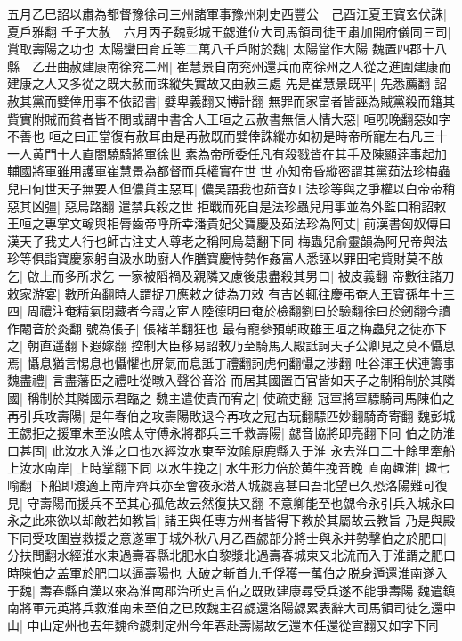 五月乙巳詔以肅為都督豫徐司三州諸軍事豫州刺史西豐公　己酉江夏王寶玄伏誅|{
	夏戶雅翻}
壬子大赦　六月丙子魏彭城王勰進位大司馬領司徒王肅加開府儀同三司|{
	賞取壽陽之功也}
太陽蠻田育丘等二萬八千戶附於魏|{
	太陽當作大陽}
魏置四郡十八縣　乙丑曲赦建康南徐兖二州|{
	崔慧景自南兖州還兵而南徐州之人從之進圍建康而建康之人又多從之既大赦而誅縱失實故又曲赦三處}
先是崔慧景既平|{
	先悉薦翻}
詔赦其黨而嬖倖用事不依詔書|{
	嬖卑義翻又博計翻}
無罪而家富者皆誣為賊黨殺而籍其貲實附賊而貧者皆不問或謂中書舍人王咺之云赦書無信人情大惡|{
	咺呪晚翻惡如字不善也}
咺之曰正當復有赦耳由是再赦既而嬖倖誅縱亦如初是時帝所寵左右凡三十一人黄門十人直閤驍騎將軍徐世素為帝所委任凡有殺戮皆在其手及陳顯逹事起加輔國將軍雖用護軍崔慧景為都督而兵權實在世世亦知帝昏縱密謂其黨茹法珍梅蟲兒曰何世天子無要人但儂貨主惡耳|{
	儂吴語我也茹音如}
法珍等與之爭權以白帝帝稍惡其凶彊|{
	惡烏路翻}
遣禁兵殺之世拒戰而死自是法珍蟲兒用事並為外監口稱詔敕王咺之專掌文翰與相脣齒帝呼所幸潘貴妃父寶慶及茹法珍為阿丈|{
	前漢書匈奴傳曰漢天子我丈人行也師古注丈人尊老之稱阿烏葛翻下同}
梅蟲兒俞靈韻為阿兄帝與法珍等俱詣寶慶家躬自汲水助廚人作膳寶慶恃勢作姦富人悉誣以罪田宅貲財莫不啟乞|{
	啟上而多所求乞}
一家被䧟禍及親隣又慮後患盡殺其男口|{
	被皮義翻}
帝數往諸刀敕家游宴|{
	數所角翻時人謂捉刀應敕之徒為刀敕}
有吉凶輒往慶弔奄人王寶孫年十三四|{
	周禮注奄精氣閉藏者今謂之宦人陸德明曰奄於檢翻劉曰於驗翻徐曰於劒翻今讀作閹音於炎翻}
號為倀子|{
	倀褚羊翻狂也}
最有寵參預朝政雖王咺之梅蟲兒之徒亦下之|{
	朝直遥翻下遐嫁翻}
控制大臣移易詔敕乃至騎馬入殿詆訶天子公卿見之莫不懾息焉|{
	懾息猶言惕息也懾懼也屏氣而息詆丁禮翻訶虎何翻懾之涉翻}
吐谷渾王伏連籌事魏盡禮|{
	言盡藩臣之禮吐從暾入聲谷音浴}
而居其國置百官皆如天子之制稱制於其隣國|{
	稱制於其隣國示君臨之}
魏主遣使責而宥之|{
	使疏吏翻}
冠軍將軍驃騎司馬陳伯之再引兵攻壽陽|{
	是年春伯之攻壽陽敗退今再攻之冠古玩翻驃匹妙翻騎奇寄翻}
魏彭城王勰拒之援軍未至汝隂太守傅永將郡兵三千救壽陽|{
	勰音協將即亮翻下同}
伯之防淮口甚固|{
	此汝水入淮之口也水經汝水東至汝隂原鹿縣入于淮}
永去淮口二十餘里牽船上汝水南岸|{
	上時掌翻下同}
以水牛挽之|{
	水牛形力倍於黄牛挽音晚}
直南趣淮|{
	趣七喻翻}
下船即渡適上南岸齊兵亦至會夜永潜入城勰喜甚曰吾北望已久恐洛陽難可復見|{
	守壽陽而援兵不至其心孤危故云然復扶又翻}
不意卿能至也勰令永引兵入城永曰永之此來欲以却敵若如教旨|{
	諸王與任專方州者皆得下教於其屬故云教旨}
乃是與殿下同受攻圍豈救援之意遂軍于城外秋八月乙酉勰部分將士與永并勢擊伯之於肥口|{
	分扶問翻水經淮水東過壽春縣北肥水自黎漿北過壽春城東又北流而入于淮謂之肥口時陳伯之盖軍於肥口以逼壽陽也}
大破之斬首九千俘獲一萬伯之脱身遁還淮南遂入于魏|{
	壽春縣自漢以來為淮南郡治所史言伯之既敗建康尋受兵遂不能爭壽陽}
魏遣鎮南將軍元英將兵救淮南未至伯之已敗魏主召勰還洛陽勰累表辭大司馬領司徒乞還中山|{
	中山定州也去年魏命勰刺定州今年春赴壽陽故乞還本任還從宣翻又如字下同}

